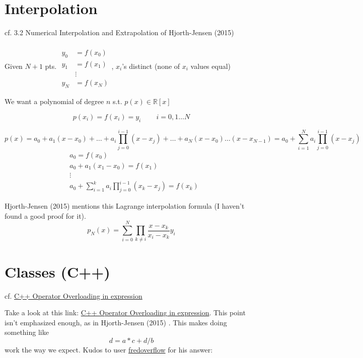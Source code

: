 \documentclass[10pt]{amsart}
\begin{document}
\begin{multicols*}{2}
\section{Interpolation}

cf. 3.2 Numerical Interpolation and Extrapolation of Hjorth-Jensen (2015) \cite{Hjor2015}

Given $N+1$ pts. $\begin{aligned} & \quad \\
  y_0 & = f(x_0) \\
  y_1 & = f(x_1) \\
  & \vdots \\
  y_N & = f(x_N) \end{aligned}$, $x_i$'s distinct (none of $x_i$ values equal)

We want a polynomial of degree $n$ s.t. $p(x)  \in \mathbb{R}[x]$

\[
p(x_i) = f(x_i) = y_i \qquad \, i = 0,1\dots N
\]

\[
p(x) = a_0 + a_1(x-x_0) + \dots + a_i \prod_{j=0}^{i-1}(x-x_j) + \dots + a_N(x-x_0) \dots (x-x_{N-1}) = a_0 + \sum_{i=1}^N a_i \prod_{j=0}^{i-1}(x-x_j)
\]
\[
\begin{aligned}
  & a_0 = f(x_0) \\ 
  & a_0 + a_1(x_1-x_0) = f(x_1) \\
  & \vdots \\
  & a_0 + \sum_{i=1}^k a_i \prod_{j=0}^{i-1} (x_k - x_j) = f(x_k)
  \end{aligned}
\]

Hjorth-Jensen (2015) \cite{Hjor2015} mentions this Lagrange interpolation formula (I haven't found a good proof for it).  
\begin{equation}
\boxed{ p_N(x) = \sum_{i=0}^N \prod_{k\neq i} \frac{ x-x_k}{x_i - x_k} y_i  }
\end{equation}

\section{Classes (C++)}

cf. \href{http://stackoverflow.com/questions/6377786/c-operator-overloading-in-expression}{C++ Operator Overloading in expression}

Take a look at this link: \href{http://stackoverflow.com/questions/6377786/c-operator-overloading-in-expression}{C++ Operator Overloading in expression}.  This point isn't emphasized enough, as in Hjorth-Jensen (2015) \cite{Hjor2015}.  This makes doing something like
\[
d = a*c + d/b
\]
work the way we expect.  Kudos to user \href{http://stackoverflow.com/users/252000/fredoverflow}{fredoverflow} for his answer:


\end{multicols*}
\end{document}
